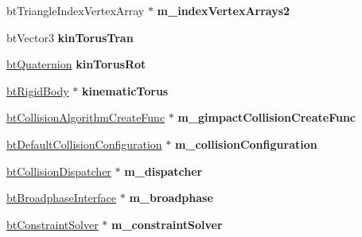 \begin{DoxyCompactItemize}
\item 
\hypertarget{class_gimpact_concave_demo_a7e1779a5c6d6fec60ae74365f69ef630}{bt\+Triangle\+Index\+Vertex\+Array $\ast$ {\bfseries m\+\_\+index\+Vertex\+Arrays2}}\label{class_gimpact_concave_demo_a7e1779a5c6d6fec60ae74365f69ef630}

\item 
\hypertarget{class_gimpact_concave_demo_affc878d6ae0641d4a9aabc8810282f61}{bt\+Vector3 {\bfseries kin\+Torus\+Tran}}\label{class_gimpact_concave_demo_affc878d6ae0641d4a9aabc8810282f61}

\item 
\hypertarget{class_gimpact_concave_demo_a24b293a7dd0c54314ffeae8938f181a5}{\hyperlink{classbt_quaternion}{bt\+Quaternion} {\bfseries kin\+Torus\+Rot}}\label{class_gimpact_concave_demo_a24b293a7dd0c54314ffeae8938f181a5}

\item 
\hypertarget{class_gimpact_concave_demo_ae0b0f939feaed16459b9194be459520b}{\hyperlink{classbt_rigid_body}{bt\+Rigid\+Body} $\ast$ {\bfseries kinematic\+Torus}}\label{class_gimpact_concave_demo_ae0b0f939feaed16459b9194be459520b}

\item 
\hypertarget{class_gimpact_concave_demo_a809f1cee81a01dcd84e54c2c6398ca99}{\hyperlink{structbt_collision_algorithm_create_func}{bt\+Collision\+Algorithm\+Create\+Func} $\ast$ {\bfseries m\+\_\+gimpact\+Collision\+Create\+Func}}\label{class_gimpact_concave_demo_a809f1cee81a01dcd84e54c2c6398ca99}

\item 
\hypertarget{class_gimpact_concave_demo_a76cedfaa5bda7914ba0fd856d6e02cd2}{\hyperlink{classbt_default_collision_configuration}{bt\+Default\+Collision\+Configuration} $\ast$ {\bfseries m\+\_\+collision\+Configuration}}\label{class_gimpact_concave_demo_a76cedfaa5bda7914ba0fd856d6e02cd2}

\item 
\hypertarget{class_gimpact_concave_demo_a5adb2f56f253f1b6d44498994a9bf9e7}{\hyperlink{classbt_collision_dispatcher}{bt\+Collision\+Dispatcher} $\ast$ {\bfseries m\+\_\+dispatcher}}\label{class_gimpact_concave_demo_a5adb2f56f253f1b6d44498994a9bf9e7}

\item 
\hypertarget{class_gimpact_concave_demo_a9152bab4c23fd54dd2d7b7f3dbabd93d}{\hyperlink{classbt_broadphase_interface}{bt\+Broadphase\+Interface} $\ast$ {\bfseries m\+\_\+broadphase}}\label{class_gimpact_concave_demo_a9152bab4c23fd54dd2d7b7f3dbabd93d}

\item 
\hypertarget{class_gimpact_concave_demo_ad4ac8ce7447609d169be7ac26c91393f}{\hyperlink{classbt_constraint_solver}{bt\+Constraint\+Solver} $\ast$ {\bfseries m\+\_\+constraint\+Solver}}\label{class_gimpact_concave_demo_ad4ac8ce7447609d169be7ac26c91393f}

\end{DoxyCompactItemize}


